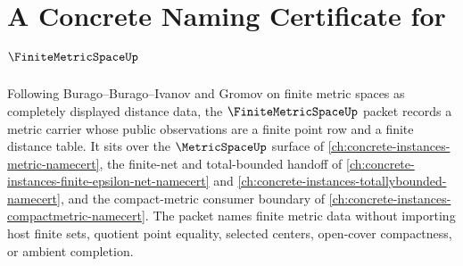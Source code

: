 \chapter{A Concrete Naming Certificate for $\FiniteMetricSpaceUp$}
\label{ch:concrete-instances-finite-metric-space-namecert}

Following Burago--Burago--Ivanov and Gromov on finite metric spaces as completely displayed distance data, the $\FiniteMetricSpaceUp$ packet records a metric carrier whose public observations are a finite point row and a finite distance table. It sits over the $\MetricSpaceUp$ surface of \autoref{ch:concrete-instances-metric-namecert}, the finite-net and total-bounded handoff of \autoref{ch:concrete-instances-finite-epsilon-net-namecert} and \autoref{ch:concrete-instances-totallybounded-namecert}, and the compact-metric consumer boundary of \autoref{ch:concrete-instances-compactmetric-namecert}. The packet names finite metric data without importing host finite sets, quotient point equality, selected centers, open-cover compactness, or ambient completion.

